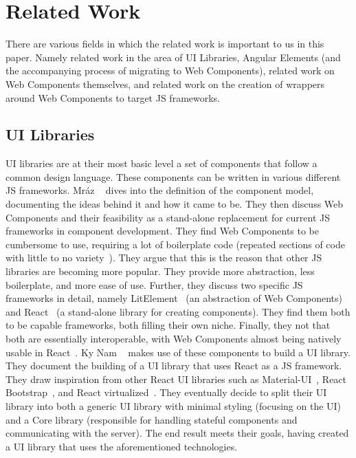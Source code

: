 \chapter{Related Work}\label{chap:related-work}

There are various fields in which the related work is important to us in this paper. Namely related work in the area of UI Libraries, Angular Elements (and the accompanying process of migrating to Web Components), related work on Web Components themselves, and related work on the creation of wrappers around Web Components to target JS frameworks.

\section{UI Libraries}
UI libraries are at their most basic level a set of components that follow a common design language. These components can be written in various different JS frameworks. Mráz \etal{}~\cite{mrazcomponent} dives into the definition of the component model, documenting the ideas behind it and how it came to be. They then discuss Web Components and their feasibility as a stand-alone replacement for current JS frameworks in component development. They find Web Components to be cumbersome to use, requiring a lot of boilerplate code (repeated sections of code with little to no variety~\cite{inproceedings}). They argue that this is the reason that other JS libraries are becoming more popular. They provide more abstraction, less boilerplate, and more ease of use. Further, they discuss two specific JS frameworks in detail, namely LitElement~ (an abstraction of Web Components) and React~ (a stand-alone library for creating components). They find them both to be capable frameworks, both filling their own niche. Finally, they not that both are essentially interoperable, with Web Components almost being natively usable in React~.
Ky Nam \etal{}~\cite{ky2019ui} makes use of these components to build a UI library. They document the building of a UI library that uses React as a JS framework. They draw inspiration from other React UI libraries such as Material-UI~, React Bootstrap~, and React virtualized~. They eventually decide to split their UI library into both a generic UI library with minimal styling (focusing on the UI) and a Core library (responsible for handling stateful components and communicating with the server). The end result meets their goals, having created a UI library that uses the aforementioned technologies.
